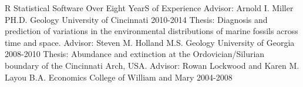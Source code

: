 \begin{cventries}
  \cventry
    {}
    {R Statistical Software}
    {}
    {}
    {Over Eight YearS of Experience}
  \cventry
    {Advisor: Arnold I. Miller}
    {PH.D. Geology}
    {University of Cincinnati}
    {2010-2014}
    {Thesis: Diagnosis and prediction of variations in the environmental distributions of marine fossils across time and space.}
    \cventry
    {Advisor: Steven M. Holland}
    {M.S. Geology}
    {University of Georgia}
    {2008-2010}
    {Thesis: Abundance and extinction at the Ordovician/Silurian boundary of the Cincinnati Arch, USA.}
    \cventry
    {Advisor: Rowan Lockwood and Karen M. Layou}
    {B.A. Economics}
    {College of William and Mary}
    {2004-2008}{}
\end{cventries}